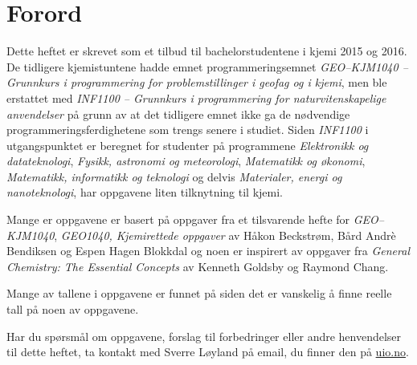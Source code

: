 
\chapter{Forord}
Dette heftet er skrevet som et tilbud til bachelorstudentene i kjemi 2015 og 2016. De tidligere kjemistuntene hadde emnet programmeringsemnet \emph{GEO--KJM1040 -- Grunn\-kurs i programmering for problemstillinger i geofag og i kjemi}, men ble erstattet med \emph{INF1100 -- Grunnkurs i programmering for naturvitenskapelige anvendelser} på grunn av at det tidligere emnet ikke ga de nødvendige programmeringsferdighetene som trengs senere i studiet. Siden \emph{INF1100} i utgangspunktet er beregnet for studenter på programmene \emph{Elektronikk og datateknologi}, \emph{Fysikk, astronomi og meteorologi}, \emph{Matematikk og økonomi}, \emph{Matematikk, informatikk og teknologi} og delvis \emph{Materialer, energi og nanoteknologi}, har oppgavene liten tilknytning til kjemi. 

Mange er oppgavene er basert på oppgaver fra et tilsvarende hefte for \emph{GEO--KJM1040}, \emph{GEO1040, Kjemirettede oppgaver} av Håkon Beckstrøm, Bård Andrè Bendiksen og Espen Hagen Blokkdal og noen er inspirert av oppgaver fra \emph{General Chemistry: The Essential Concepts} av Kenneth Goldsby og Raymond Chang. 

Mange av tallene i oppgavene er funnet på siden det er vanskelig å finne reelle tall på noen av oppgavene.

Har du spørsmål om oppgavene, forslag til forbedringer eller andre henvendelser til dette heftet, ta kontakt med Sverre Løyland på email, du finner den på  \href{www.uio.no}{uio.no}.